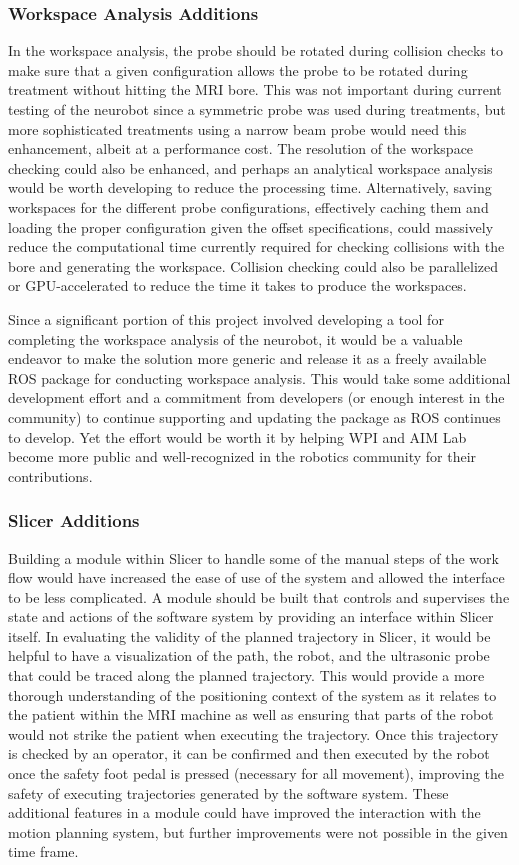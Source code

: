 \documentclass[12pt]{report}
\begin{document}
\subsubsection{Workspace Analysis Additions}
In the workspace analysis, the probe should be rotated during collision checks to make sure that a given configuration allows the probe to be rotated during treatment without hitting the MRI bore. This was not important during current testing of the neurobot since a symmetric probe was used during treatments, but more sophisticated treatments using a narrow beam probe would need this enhancement, albeit at a performance cost. The resolution of the workspace checking could also be enhanced, and perhaps an analytical workspace analysis would be worth developing to reduce the processing time. Alternatively, saving workspaces for the different probe configurations, effectively caching them and loading the proper configuration given the offset specifications, could massively reduce the computational time currently required for checking collisions with the bore and generating the workspace. Collision checking could also be parallelized or GPU-accelerated to reduce the time it takes to produce the workspaces.

Since a significant portion of this project involved developing a tool for completing the workspace analysis of the neurobot, it would be a valuable endeavor to make the solution more generic and release it as a freely available ROS package for conducting workspace analysis. This would take some additional development effort and a commitment from developers (or enough interest in the community) to continue supporting and updating the package as ROS continues to develop. Yet the effort would be worth it by helping WPI and AIM Lab become more public and well-recognized in the robotics community for their contributions.

\subsubsection{Slicer Additions}
Building a module within Slicer to handle some of the manual steps of the work flow would have increased the ease of use of the system and allowed the interface to be less complicated. A module should be built that controls and supervises the state and actions of the software system by providing an interface within Slicer itself. In evaluating the validity of the planned trajectory in Slicer, it would be helpful to have a visualization of the path, the robot, and the ultrasonic probe that could be traced along the planned trajectory. This would provide a more thorough understanding of the positioning context of the system as it relates to the patient within the MRI machine as well as ensuring that parts of the robot would not strike the patient when executing the trajectory. Once this trajectory is checked by an operator, it can be confirmed and then executed by the robot once the safety foot pedal is pressed (necessary for all movement), improving the safety of executing trajectories generated by the software system. These additional features in a module could have improved the interaction with the motion planning system, but further improvements were not possible in the given time frame.
\end{document}
